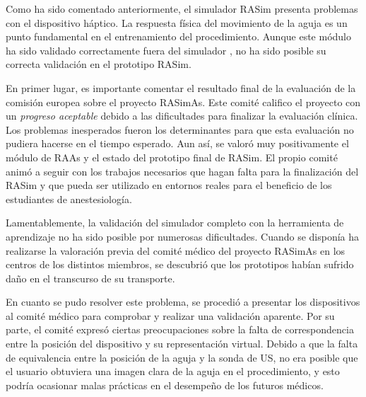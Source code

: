 Como ha sido comentado anteriormente, el simulador \ac{RASim} presenta problemas con el dispositivo háptico. La respuesta física del movimiento de la aguja es un punto fundamental en el entrenamiento del procedimiento. Aunque este módulo ha sido validado correctamente fuera del simulador \cite{needleinsertion}, no ha sido posible su correcta validación en el prototipo \ac{RASim}.

En primer lugar, es importante comentar el resultado final de la evaluación de la comisión europea sobre el proyecto \ac{RASimAs}. Este comité califico el proyecto con un \emph{progreso aceptable} debido a las dificultades para finalizar la evaluación clínica. Los problemas inesperados fueron los determinantes para que esta evaluación no pudiera hacerse en el tiempo esperado. Aun así, se valoró muy positivamente el módulo de \ac{RAAs} y el estado del prototipo final de \ac{RASim}. El propio comité animó a seguir con los trabajos necesarios que hagan falta para la finalización del \ac{RASim} y que pueda ser utilizado en entornos reales para el beneficio de los estudiantes de anestesiología.

Lamentablemente, la validación del simulador completo con la herramienta de aprendizaje no ha sido posible por numerosas dificultades.
Cuando se disponía ha realizarse la valoración previa del comité médico del proyecto \ac{RASimAs} en los centros de los distintos miembros, se descubrió que los prototipos habían sufrido daño en el transcurso de su transporte.%

En cuanto se pudo resolver este problema, se procedió a presentar los dispositivos al comité médico para comprobar y realizar una validación aparente. Por su parte, el comité expresó ciertas preocupaciones sobre la falta de correspondencia entre la posición del dispositivo y su representación virtual. Debido a que la falta de equivalencia entre la posición de la aguja y la sonda de \ac{US}, no era posible que el usuario obtuviera una imagen clara de la aguja en el procedimiento, y esto podría ocasionar malas prácticas en el desempeño de los futuros médicos. %

